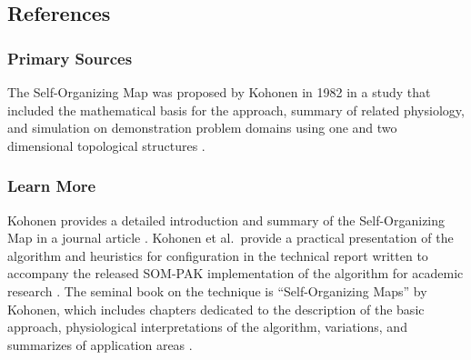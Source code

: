 \subsection{References}

% 
% 
\subsubsection{Primary Sources}
The Self-Organizing Map was proposed by Kohonen in 1982 in a study that included the mathematical basis for the approach, summary of related physiology, and simulation on demonstration problem domains using one and two dimensional topological structures \cite{Kohonen1982}.

% 
% 
\subsubsection{Learn More}
Kohonen provides a detailed introduction and summary of the Self-Organizing Map in a journal article \cite{Kohonen1990a}.
Kohonen et al.\ provide a practical presentation of the algorithm and heuristics for configuration in the technical report written to accompany the released SOM-PAK implementation of the algorithm for academic research \cite{Kohonen1996a}.
The seminal book on the technique is ``Self-Organizing Maps'' by Kohonen, which includes chapters dedicated to the description of the basic approach, physiological interpretations of the algorithm, variations, and summarizes of application areas \cite{Kohonen1995}.


